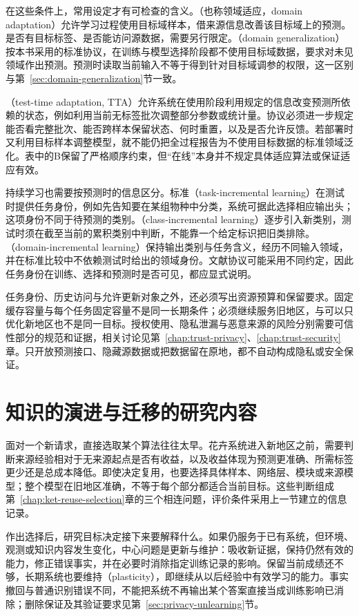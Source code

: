 在这些条件上，常用设定才有可检查的含义。（也称领域适应，domain adaptation）允许学习过程使用目标域样本，借来源信息改善该目标域上的预测。是否有目标标签、是否能访问源数据，需要另行限定。（domain generalization）按本书采用的标准协议，在训练与模型选择阶段都不使用目标域数据，要求对未见领域作出预测。预测时读取当前输入不等于得到针对目标域调参的权限，这一区别与第~\ref{sec:domain-generalization}节一致。

（test-time adaptation, TTA）允许系统在使用阶段利用规定的信息改变预测所依赖的状态，例如利用当前无标签批次调整部分参数或统计量。协议必须进一步规定能否看完整批次、能否跨样本保留状态、何时重置，以及是否允许反馈。若部署时又利用目标样本调整模型，就不能仍把全过程报告为不使用目标数据的标准领域泛化。表中的B保留了严格顺序约束，但“在线”本身并不规定具体适应算法或保证适应有效。

持续学习也需要按预测时的信息区分。标准（task-incremental learning）在测试时提供任务身份，例如先告知要在某组物种中分类，系统可据此选择相应输出头；这项身份不同于待预测的类别。（class-incremental learning）逐步引入新类别，测试时须在截至当前的累积类别中判断，不能靠一个给定标识把旧类排除。（domain-incremental learning）保持输出类别与任务含义，经历不同输入领域，并在标准比较中不依赖测试时给出的领域身份。文献协议可能采用不同约定，因此任务身份在训练、选择和预测时是否可见，都应显式说明。

任务身份、历史访问与允许更新对象之外，还必须写出资源预算和保留要求。固定缓存容量与每个任务固定容量不是同一长期条件；必须继续服务旧地区，与可以只优化新地区也不是同一目标。授权使用、隐私泄漏与恶意来源的风险分别需要可信性部分的规范和证据，相关讨论见第~\ref{chap:trust-privacy}、\ref{chap:trust-security}章。只开放预测接口、隐藏源数据或把数据留在原地，都不自动构成隐私或安全保证。

\section{知识的演进与迁移的研究内容}
\label{sec:ket-overview-research}

面对一个新请求，直接选取某个算法往往太早。花卉系统进入新地区之前，需要判断来源经验相对于无来源起点是否有收益，以及收益体现为预测更准确、所需标签更少还是总成本降低。即使决定复用，也要选择具体样本、网络层、模块或来源模型；整个模型在旧地区准确，不等于每个部分都适合当前目标。这些判断组成第~\ref{chap:ket-reuse-selection}章的三个相连问题，评价条件采用上一节建立的信息记录。

作出选择后，研究目标决定接下来要解释什么。如果仍服务于已有系统，但环境、观测或知识内容发生变化，中心问题是更新与维护：吸收新证据，保持仍然有效的能力，修正错误事实，并在必要时消除指定训练记录的影响。保留当前成绩还不够，长期系统也要维持（plasticity），即继续从以后经验中有效学习的能力。事实撤回与普通识别错误不同，不能把系统不再输出某个答案直接当成训练影响已消除；删除保证及其验证要求见第~\ref{sec:privacy-unlearning}节。


